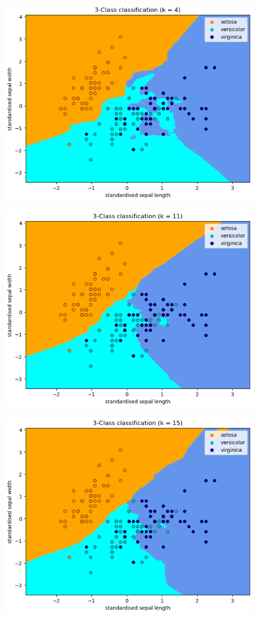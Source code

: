 \documentclass[12pt]{article}
\begin{document}
\includegraphics{2.3.2.png}

\includegraphics{2.3.3.png}

\includegraphics{2.3.4.png}
\end{document}
